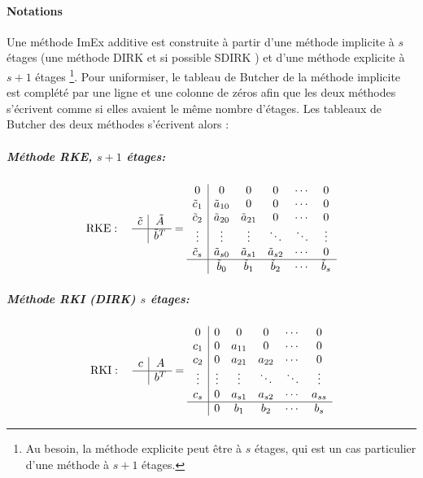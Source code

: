     \paragraph{Notations}
        Une méthode ImEx additive est construite à partir d'une méthode implicite à $s$ étages (une méthode DIRK et si possible SDIRK \cite{nasa_DIRK}) et d'une méthode explicite à $s+1$ étages
        \footnote{Au besoin, la méthode explicite peut être à $s$ étages, qui est un cas particulier d'une méthode à $s+1$ étages.}.
        Pour uniformiser, le tableau de Butcher de la méthode implicite est complété par une ligne et une colonne de zéros afin que les deux méthodes
        s'écrivent comme si elles avaient le même nombre d'étages.
        Les tableaux de Butcher des deux méthodes s'écrivent alors :
        
        \subparagraph{Méthode RKE, $s+1$ étages:}
        \begin{align}
        \text{RKE} : \quad
        \begin{array}{c|c}
        \tilde{c} & \tilde{A} \\
        \hline
        & \tilde{b}^T
        \end{array}
        =
        \begin{array}{c|ccccc}
        0 & 0 & 0 & 0 & \cdots & 0 \\
        \tilde{c}_1 & \tilde{a}_{10} & 0 & 0 & \cdots & 0 \\
        \tilde{c}_2 & \tilde{a}_{20} & \tilde{a}_{21} & 0 & \cdots & 0 \\
        \vdots & \vdots & \vdots & \ddots & \ddots & \vdots \\
        \tilde{c}_s & \tilde{a}_{s0} & \tilde{a}_{s1} & \tilde{a}_{s2} & \cdots & 0 \\
        \hline
        & \tilde{b}_0 & \tilde{b}_1 & \tilde{b}_2 & \cdots & \tilde{b}_s
        \end{array}
        \end{align}
        
        \subparagraph{Méthode RKI (DIRK) $s$ étages:}
        \begin{align}
        \text{RKI} : \quad
        \begin{array}{c|c}
        c & A \\
        \hline
        & b^T
        \end{array}
        =
        \begin{array}{c|ccccc}
        0 & 0 & 0 & 0 & \cdots & 0 \\
        c_1 & 0 & a_{11} & 0 & \cdots & 0 \\
        c_2 & 0 & a_{21} & a_{22} & \cdots & 0 \\
        \vdots & \vdots & \vdots & \ddots & \ddots & \vdots \\
        c_s & 0 & a_{s1} & a_{s2} & \cdots & a_{ss} \\
        \hline
        & 0 & b_1 & b_2 & \cdots & b_s
        \end{array}
        \end{align}
        
